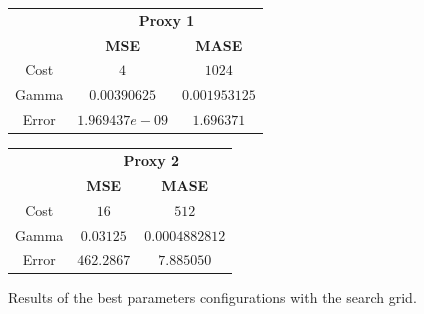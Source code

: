\begin{figure}[!h]
\centering
\begin{minipage}{\textwidth}
\begin{minipage}{0.5\textwidth}
\begin{center}
\vskip10pt
   \begin{footnotesize}
   \begin{tabular}{|c|c|c|}
   \hline
   & \multicolumn{2}{|c|}{\textbf{Proxy 1}} \\ \cline{2-3}
   & \textbf{MSE} & \textbf{MASE}          \\ \hline
   Cost  & $4$            & $1024$          \\ 
   Gamma & $0.00390625$ & $0.001953125$ \\ 
   Error & $1.969437e-09$ & $1.696371$     \\ 
   \hline
   \end{tabular}
   \end{footnotesize}
\end{center}
\end{minipage}
\begin{minipage}{0.5\textwidth}
\begin{center}
\vskip12pt
   \begin{footnotesize}
   \begin{tabular}{|c|c|c|}
   \hline
   & \multicolumn{2}{|c|}{\textbf{Proxy 2}} \\ \cline{2-3}
   & \textbf{MSE} & \textbf{MASE}          \\ \hline
   Cost  & $16$      & $512$          \\ 
   Gamma & $0.03125$ & $0.0004882812$ \\ 
   Error & $462.2867$      & $7.885050$     \\ 
   \hline
   \end{tabular}
   \end{footnotesize}
\end{center}
\end{minipage}
\end{minipage}
\caption{Results of the best parameters configurations with the search grid.}
\label{fig:table10y}
\end{figure}
